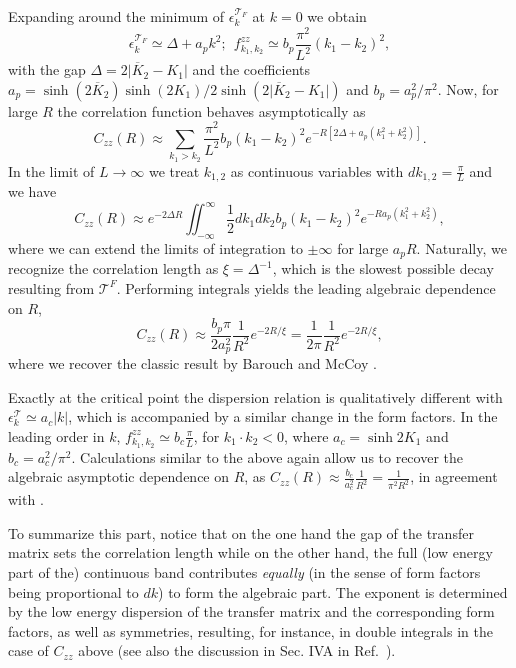 \documentclass[prl,twocolumn,showpacs,floatfix,superscriptaddress,nofootinbib]{revtex4-1}
\begin{document}
Expanding around the minimum of $ \epsilon_k^{\mathcal{T}_F}$ at $k=0$ we obtain
\begin{equation*}
      \epsilon^{\mathcal{T}_F}_k \simeq \Delta +  a_p  k^2; \ \  f^{zz}_{k_1,k_2}  \simeq b_p \frac{\pi^2}{L^2}  (k_1-k_2)^2,
\end{equation*}
with the gap $\Delta=2 \vert \overline K_2 - K_1\vert $ and the coefficients 
$a_p = \sinh(2 \overline K_2)\sinh(2 K_1) / 2 \sinh(2 \vert \overline K_2 - K_1\vert)$ 
and 
$b_p = a_p^2 / \pi^2$.
Now, for large $R$ the correlation function behaves asymptotically as
\begin{equation*}
C_{zz}(R)  \approx \sum_{k_1 > k_2} \frac{\pi^2 }{L^2} b_p (k_1-k_2)^2  e^{-R[2 \Delta + a_p (k_1^2 + k_2 ^2)]}.
\end{equation*}
In the limit of $L \to \infty$ we treat $k_{1,2}$ as continuous variables with $dk_{1,2} = \frac{\pi}{L}$ and we have
\begin{equation*}
C_{zz}(R)  \approx e^{-2 \Delta R }  \iint_{-\infty}^{\infty} \frac12 dk_1 dk_2 b_p (k_1 -k_2)^2 e^{-R a_p (k_1^2 + k_2^2)},
\end{equation*}
where we can extend the limits of integration to $\pm \infty$ for large $a_p R$. 
Naturally, we recognize the correlation length as $\xi = \Delta^{-1}$, which is the slowest possible decay resulting from $\mathcal{T}^F$. 
Performing integrals yields the leading algebraic dependence on $R$,
\begin{equation*}
C_{zz}(R)  \approx \frac{b_p \pi }{2 a_p^2 } \frac{1}{R^2}e^{-2 R/\xi }=\frac{1 }{2 \pi } \frac{1}{R^2}e^{-2 R/\xi }, 
\end{equation*}
where we recover the classic result by Barouch and McCoy \cite{Barouch1971}. 

Exactly at the critical point the dispersion relation is qualitatively different with $\epsilon^{\mathcal T}_k \simeq a_c |k|$, which is accompanied by a similar change in the form factors. 
In the leading order in $k$, 
$f^{zz}_{k_1,k_2}  \simeq b_c \frac{\pi}{L} $, for $k_1 \cdot k_2 <0$, 
where $a_c = \sinh 2 K_1$ and $b_c = a_c^2 / \pi^2$.  
Calculations similar to the above again allow us to recover the algebraic asymptotic dependence on $R$, as 
$C_{zz}(R)  \approx \frac{b_c}{a_c^2}\frac{1}{R^2} = \frac{1}{\pi^2 R^2}$, 
in agreement with \cite{Barouch1971}.

To summarize this part, notice that on the one hand the gap of the transfer matrix sets the correlation length while on the other hand, the full (low energy part of the) continuous band contributes {\it equally} (in the sense of form factors being proportional to $dk$) to form the algebraic part. 
The exponent is determined by the low energy dispersion of the transfer matrix and the corresponding form factors, as well as symmetries, resulting, for instance, in double integrals in the case of $C_{zz}$ above (see also the discussion in Sec. IVA in Ref.~).
\end{document}
